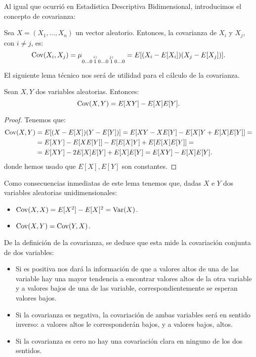 Al igual que ocurrió en Estadística Descriptiva Bidimensional, introducimos el concepto de covarianza:
\begin{definicion}[Covarianza]
    Sea $X=(X_1,\dots,X_n)$ un vector aleatorio. Entonces, la covarianza de $X_i$ y $X_j$, con $i\neq j$, es:
    \begin{equation*}
        \operatorname{Cov}(X_i,X_j) = \mu_{0 \dots 0 \, \overset{i)}{1} \, 0 \dots 0 \, \overset{j)}{1} \, 0 \dots 0} = E[(X_i-E[X_i])(X_j-E[X_j])].
    \end{equation*}
\end{definicion}
El siguiente lema técnico nos será de utilidad para el cálculo de la covarianza.
\begin{lema}
    Sean $X,Y$ dos variables aleatorias. Entonces:
    \begin{equation*}
        \operatorname{Cov}(X,Y) = E[XY] - E[X]E[Y].
    \end{equation*}
\end{lema}
\begin{proof}
    Tenemos que:
    \begin{align*}
        \operatorname{Cov}(X,Y) &= E[(X-E[X])(Y-E[Y])] = E[XY - XE[Y] - E[X]Y + E[X]E[Y]] =\\
        &= E[XY] - E[XE[Y]] - E[E[X]Y] + E[E[X]E[Y]] =\\
        &= E[XY] - 2E[X]E[Y] + E[X]E[Y] = E[XY] - E[X]E[Y].
    \end{align*}
    donde hemos usado que $E[X],E[Y]$ son constantes.
\end{proof}

Como consecuencias inmediatas de este lema tenemos que, dadas $X$ e $Y$ dos variables aleatorias unidimensionales:
\begin{itemize}
    \item $\operatorname{Cov}(X,X) = E[X^2] - E[X]^2 = \operatorname{Var}(X)$.
    \item $\operatorname{Cov}(X,Y) = \operatorname{Cov}(Y,X)$.
\end{itemize}

De la definición de la covarianza, se deduce que esta mide la covariación conjunta de dos variables:
\begin{itemize}
    \item Si es positiva nos dará la información de que a valores altos de una de las variable hay una mayor tendencia a encontrar valores altos de la otra variable y a valores bajos de una de las variable, correspondientemente se esperan valores bajos.
    \item Si la covarianza es negativa, la covariación de ambas variables será en sentido inverso: a valores altos le corresponderán bajos, y a valores bajos, altos.
    \item Si la covarianza es cero no hay una covariación clara en ninguno de los dos sentidos.
\end{itemize}


